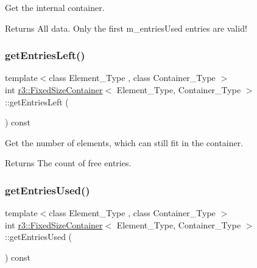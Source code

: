 Get the internal container. 

\begin{DoxyReturn}{Returns}
All data. Only the first m\+\_\+entries\+Used entries are valid! 
\end{DoxyReturn}
\mbox{\label{classr3_1_1_fixed_size_container_a5d21f93fcf7117df372d321c0d9102fa}} 
\subsubsection{\texorpdfstring{get\+Entries\+Left()}{getEntriesLeft()}}
{\footnotesize\ttfamily template$<$class Element\+\_\+\+Type , class Container\+\_\+\+Type $>$ \\
int \mbox{\hyperlink{classr3_1_1_fixed_size_container}{r3\+::\+Fixed\+Size\+Container}}$<$ Element\+\_\+\+Type, Container\+\_\+\+Type $>$\+::get\+Entries\+Left (\begin{DoxyParamCaption}{ }\end{DoxyParamCaption}) const}



Get the number of elements, which can still fit in the container. 

\begin{DoxyReturn}{Returns}
The count of free entries. 
\end{DoxyReturn}
\mbox{\label{classr3_1_1_fixed_size_container_a4ec349530e78e78244f739139ed58b49}} 
\subsubsection{\texorpdfstring{get\+Entries\+Used()}{getEntriesUsed()}}
{\footnotesize\ttfamily template$<$class Element\+\_\+\+Type , class Container\+\_\+\+Type $>$ \\
int \mbox{\hyperlink{classr3_1_1_fixed_size_container}{r3\+::\+Fixed\+Size\+Container}}$<$ Element\+\_\+\+Type, Container\+\_\+\+Type $>$\+::get\+Entries\+Used (\begin{DoxyParamCaption}{ }\end{DoxyParamCaption}) const}



